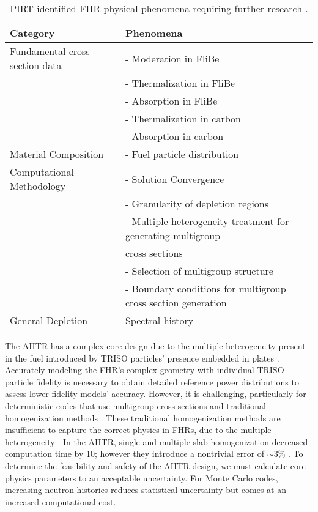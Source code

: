 \begin{table}[]
    \centering
    \onehalfspacing
    \caption{\gls{PIRT} identified \gls{FHR} physical phenomena requiring further research 
    \cite{rahnema_phenomena_2019}.}
	\label{tab:phenomena}
    \small
    \begin{tabular}{l|l}
    \hline
    \textbf{Category} & \textbf{Phenomena} \\ \hline
    Fundamental cross section data & - Moderation in FliBe \\
    & - Thermalization in FliBe \\
    & - Absorption in FliBe \\
    & - Thermalization in carbon \\
    & - Absorption in carbon \\ \hline
    Material Composition & - Fuel particle distribution \\ \hline
    Computational Methodology & - Solution Convergence \\ 
    & - Granularity of depletion regions \\
    & - Multiple heterogeneity treatment for generating multigroup \\ 
    & cross sections \\
    & - Selection of multigroup structure \\
    & - Boundary conditions for multigroup cross section generation \\ \hline 
    General Depletion & Spectral history \\ \hline 
    \end{tabular}
    \end{table}

The \gls{AHTR} has a complex core design due to the multiple heterogeneity 
present in the fuel introduced by \gls{TRISO} particles' presence embedded in 
plates \cite{ramey_monte_2018,rahnema_phenomena_2019}.
Accurately modeling the \gls{FHR}'s complex geometry with individual \gls{TRISO}
particle fidelity is necessary to obtain detailed reference power distributions 
to assess lower-fidelity models' accuracy.
However, it is challenging, particularly for deterministic codes that
use multigroup cross sections and traditional homogenization methods
\cite{ramey_monte_2018}. 
These traditional homogenization methods are insufficient to capture the correct physics 
in \glspl{FHR}, due to the multiple heterogeneity \cite{ramey_monte_2018}. 
In the \gls{AHTR}, single and multiple slab homogenization decreased computation time 
by 10; however they introduce a nontrivial error of $\sim$3\%
\cite{ramey_monte_2018,cisneros_neutronics_2012}.
To determine the feasibility and safety of the \gls{AHTR} design, we must 
calculate core physics parameters to an acceptable uncertainty. 
For Monte Carlo codes, increasing neutron histories reduces statistical 
uncertainty but comes at an increased computational cost.

